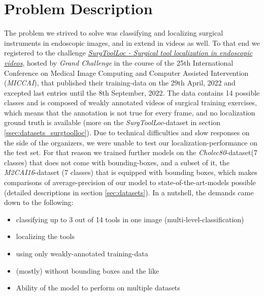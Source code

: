 \section{Problem Description}
The problem we strived to solve was classifying and localizing surgical instruments in endoscopic images, and in extend in videos as well. 
To that end we registered to the challenge \href{https://surgtoolloc.grand-challenge.org}{\emph{SurgToolLoc - Surgical tool localization in endoscopic videos}}, hosted by \emph{Grand Challenge} in the course of the 25th International Conference on Medical Image Computing and Computer Assisted Intervention (\emph{MICCAI}), that published their training-data on the 29th April, 2022 and excepted last entries until the 8th September, 2022. The data contains 14 possible classes and is composed of weakly annotated videos of surgical training exercises, which means that the annotation is not true for every frame, and no localization ground truth is available (more on the \emph{SurgToolLoc}-dataset in section \ref{ssec:datasets_surgtoolloc}). Due to technical difficulties and slow responses on the side of the organizers, we were unable to test our localization-performance on the test set. For that reason we trained further models on the \textit{Cholec80}-dataset(7 classes) that does not come with bounding-boxes, and a subset of it, the \textit{M2CAI16}-dataset (7 classes) that is equipped with bounding boxes, which makes comparisons of average-precision of our model to state-of-the-art-models possible (detailed descriptions in section \ref{sec:datasets}).
In a nutshell, the demands came down to the following:
\begin{itemize}
	\item classifying up to 3 out of 14 tools in one image (multi-level-classification)
	\item localizing the tools
	\item using only weakly-annotated training-data
	\item (mostly) without bounding boxes and the like
	\item Ability of the model to perform on multiple datasets
\end{itemize}

